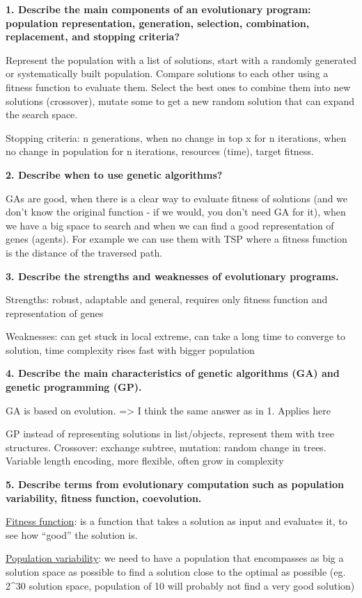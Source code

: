 \textbf{1. Describe the main components of an evolutionary program:
population representation, generation, selection, combination,
replacement, and stopping criteria?}

Represent the population with a list of solutions, start with a randomly
generated or systematically built population. Compare solutions to each
other using a fitness function to evaluate them. Select the best ones to
combine them into new solutions (crossover), mutate some to get a new
random solution that can expand the search space.

Stopping criteria: n generations, when no change in top x for n
iterations, when no change in population for n iterations, resources
(time), target fitness.

\textbf{2. Describe when to use genetic algorithms?}

GAs are good, when there is a clear way to evaluate fitness of solutions
(and we don't know the original function - if we would, you don't need
GA for it), when we have a big space to search and when we can find a
good representation of genes (agents). For example we can use them with
TSP where a fitness function is the distance of the traversed path.

\textbf{3. Describe the strengths and weaknesses of evolutionary
programs.}

Strengths: robust, adaptable and general, requires only fitness function
and representation of genes

Weaknesses: can get stuck in local extreme, can take a long time to
converge to solution, time complexity rises fast with bigger population

\textbf{4. Describe the main characteristics of genetic algorithms (GA)
and genetic programming (GP).}

GA is based on evolution. =\textgreater{} I think the same answer as in
1. Applies here

GP instead of representing solutions in list/objects, represent them
with tree structures. Crossover: exchange subtree, mutation: random
change in trees. Variable length encoding, more flexible, often grow in
complexity

\textbf{5. Describe terms from evolutionary computation such as
population variability, fitness function, coevolution.}

\underline{Fitness function}: is a function that takes a solution as
input and evaluates it, to see how ``good'' the solution is.

\underline{Population variability}: we need to have a population that
encompasses as big a solution space as possible to find a solution close
to the optimal as possible (eg. 2\^{}30 solution space, population of 10
will probably not find a very good solution)

